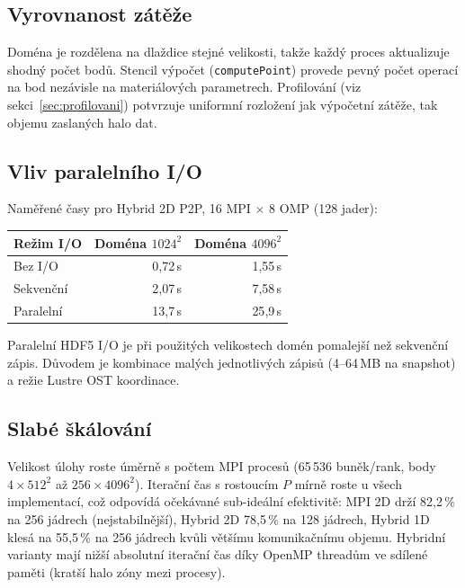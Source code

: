 \documentclass{article}
\begin{document}
\subsection*{Vyrovnanost zátěže}
Doména je rozdělena na dlaždice stejné velikosti, takže každý proces
aktualizuje shodný počet bodů. Stencil výpočet (\texttt{computePoint})
provede pevný počet operací na bod nezávisle na materiálových parametrech.
Profilování (viz sekci~\ref{sec:profilovani}) potvrzuje uniformní
rozložení jak výpočetní zátěže, tak objemu zaslaných halo dat.

\subsection*{Vliv paralelního I/O}
Naměřené časy pro Hybrid 2D P2P, 16 MPI $\times$ 8 OMP (128 jader):
\begin{center}
\begin{tabular}{lrr}
\toprule
Režim I/O & Doména $1024^2$ & Doména $4096^2$ \\
\midrule
Bez I/O    & 0{,}72\,s & 1{,}55\,s \\
Sekvenční  & 2{,}07\,s & 7{,}58\,s \\
Paralelní  & 13{,}7\,s & 25{,}9\,s \\
\bottomrule
\end{tabular}
\end{center}

Paralelní HDF5 I/O je při použitých velikostech domén pomalejší
než sekvenční zápis. Důvodem je kombinace
malých jednotlivých zápisů (4--64\,MB na snapshot) a režie Lustre OST koordinace.

\subsection*{Slabé škálování}
Velikost úlohy roste úměrně s počtem MPI procesů
(65\,536 buněk/rank, body $4 \times 512^2$ až $256 \times 4096^2$).
Iterační čas s rostoucím $P$ mírně roste u všech implementací,
což odpovídá očekávané sub-ideální efektivitě:
MPI 2D drží 82{,}2\,\% na 256 jádrech (nejstabilnější),
Hybrid 2D 78{,}5\,\% na 128 jádrech,
Hybrid 1D klesá na 55{,}5\,\% na 256 jádrech kvůli většímu komunikačnímu objemu.
Hybridní varianty mají nižší absolutní iterační čas díky OpenMP threadům
ve sdílené paměti (kratší halo zóny mezi procesy).
\end{document}
